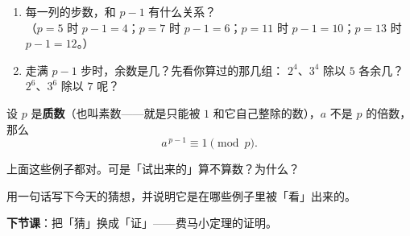 \begin{sikao}
  \begin{enumerate}
    \item 每一列的步数，和 \(p-1\) 有什么关系？\\
      （\(p=5\) 时 \(p-1=4\)；\(p=7\) 时 \(p-1=6\)；\(p=11\) 时 \(p-1=10\)；\(p=13\) 时 \(p-1=12\)。）
    \item 走满 \(p-1\) 步时，余数是几？先看你算过的那几组：
      \(2^4\)、\(3^4\) 除以 \(5\) 各余几？\(2^6\)、\(3^6\) 除以 \(7\) 呢？
  \end{enumerate}
\end{sikao}

\begin{dingli}[猜想]
  设 \(p\) 是\textbf{质数}（也叫素数——就是只能被 \(1\) 和它自己整除的数），\(a\) 不是 \(p\) 的倍数，那么
  \[
    a^{\,p-1}\equiv1 \pmod p .
  \]
\end{dingli}

\begin{sikao}
  上面这些例子都对。可是「试出来的」算不算数？为什么？
\end{sikao}

\begin{xiaojie}
  用一句话写下今天的猜想，并说明它是在哪些例子里被「看」出来的。
\end{xiaojie}

\noindent\textbf{下节课}：把「猜」换成「证」——费马小定理的证明。
